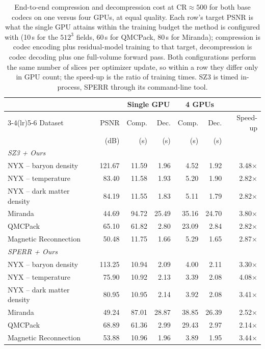 \begin{table}[t]
  \centering
  \caption{End-to-end compression and decompression cost at
  $\mathrm{CR}\!\approx\!500$ for both base codecs on one versus four GPUs,
  at equal quality. Each row's target PSNR is what the single GPU attains
  within the training budget the method is configured with (10\,s for the
  $512^3$ fields, 60\,s for QMCPack, 80\,s for Miranda); compression is codec
  encoding plus residual-model training to that target, decompression is
  codec decoding plus one full-volume forward pass. Both configurations
  perform the same number of slices per optimizer update, so within a row
  they differ only in GPU count; the speed-up is the ratio of training times.
  SZ3 is timed in-process, SPERR through its command-line tool.}
  \label{tab:parallel-time}
  \begin{tabular}{lrrrrrr}
    \toprule
    & & \multicolumn{2}{c}{Single GPU} & \multicolumn{2}{c}{4 GPUs} & \\
    \cmidrule(lr){3-4}\cmidrule(lr){5-6}
    Dataset & PSNR & Comp. & Dec. & Comp. & Dec. & Speed-up \\
            & (dB) & (s)   & (s)  & (s)   & (s)  &          \\
    \midrule
    \multicolumn{7}{l}{\textit{SZ3 + Ours}} \\
    NYX -- baryon density      & 121.67 &  11.59 &  1.96 &  4.52 &  1.92 & 3.48$\times$ \\
    NYX -- temperature         &  83.40 &  11.58 &  1.93 &  5.20 &  1.90 & 2.82$\times$ \\
    NYX -- dark matter density &  84.19 &  11.55 &  1.83 &  5.11 &  1.79 & 2.82$\times$ \\
    Miranda                    &  44.69 &  94.72 & 25.49 & 35.16 & 24.70 & 3.80$\times$ \\
    QMCPack                    &  65.10 &  61.82 &  2.80 & 23.09 &  2.84 & 2.82$\times$ \\
    Magnetic Reconnection      &  50.48 &  11.75 &  1.66 &  5.29 &  1.65 & 2.87$\times$ \\
    \midrule
    \multicolumn{7}{l}{\textit{SPERR + Ours}} \\
    NYX -- baryon density      & 113.25 &  10.94 &  2.09 &  4.00 &  2.11 & 3.30$\times$ \\
    NYX -- temperature         &  75.90 &  10.92 &  2.13 &  3.39 &  2.08 & 4.08$\times$ \\
    NYX -- dark matter density &  80.95 &  10.95 &  2.14 &  3.92 &  2.08 & 3.41$\times$ \\
    Miranda                    &  49.24 &  87.01 & 28.87 & 38.85 & 26.39 & 2.52$\times$ \\
    QMCPack                    &  68.89 &  61.36 &  2.99 & 29.43 &  2.97 & 2.14$\times$ \\
    Magnetic Reconnection      &  53.88 &  10.96 &  1.96 &  3.89 &  1.95 & 3.44$\times$ \\
    \bottomrule
  \end{tabular}
\end{table}

